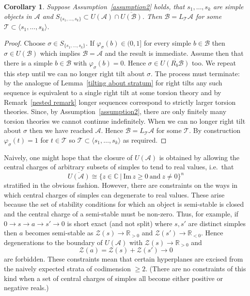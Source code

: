 \documentclass{article}
\theoremstyle{plain}
\newtheorem{corollary}[theorem]{Corollary}
\theoremstyle{definition}
\theoremstyle{remark}
\newcommand{\ie}{i.e.\ }
\newcommand{\R}{\mathbb{R}}
\newcommand{\C}{\mathbb{C}}
\newcommand{\cat}[1]{\mathcal{#1}}
\begin{document}
\begin{corollary}
\label{intersection corollary converse}
Suppose Assumption~\ref{assumption2} holds, that $s_1,\ldots,s_k$ are simple objects in $\cat{A}$ and $S_{\{s_1,\ldots,s_k\}} \subset U(\cat{A}) \cap  \overline{U(\cat{B})}$. Then $\cat{B}=L_\cat{T}\cat{A}$ for some $\cat{T}\subset \langle s_1,\ldots,s_k\rangle$.
\end{corollary}
\begin{proof}
Choose $\sigma \in S_{\{s_1,\ldots,s_k\}}$. If $\varphi_\sigma(b) \in (0,1]$ for every simple $b\in \cat{B}$ then $\sigma \in U(\cat{B})$ which implies $\cat{B}=\cat{A}$ and the result is immediate. Assume then that there is a simple $b\in \cat{B}$ with $\varphi_\sigma(b) = 0$. Hence $\sigma \in \overline{U(R_{b}\cat{B})}$ too. We repeat this step until we can no longer right tilt about $\sigma$. The process must terminate: by the analogue of Lemma~\ref{tilting about stratum} for right tilts  any such sequence is equivalent to a single right tilt at some torsion theory and by Remark~\ref{nested remark} longer sequences correspond to strictly larger  torsion theories. Since, by Assumption~\ref{assumption2}, there are only finitely many torsion theories we cannot continue indefinitely. When we can no longer right tilt about $\sigma$ then we have reached $\cat{A}$. Hence $\cat{B} = L_\cat{T}\cat{A}$ for some $\cat{T}$. By construction $\varphi_\sigma(t) =1$ for $t\in \cat{T}$ so $\cat{T} \subset \langle s_1, \ldots,s_k\rangle$ as required.
\end{proof}

Naively, one might hope that the closure of $U(\cat{A})$ is obtained by allowing the central charges of arbitrary subsets of simples to tend to real values, \ie that
$$
\overline{U(\cat{A})} \cong \{ z\in \C \ |\ \mathrm{Im}\, z \geq 0\ \textrm{and} \ z\neq 0\}^n
$$
stratified in the obvious fashion. However, there are constraints on the ways in which central charges of simples can degenerate to real values. These arise because the set of stability conditions for which an object is semi-stable is closed \cite[Proposition 8.1]{MR2373143} and the central charge of a semi-stable must be non-zero. Thus, for example, if $0 \to s \to a \to s'\to 0$ is short exact (and not split) where $s,s'$ are distinct simples then $a$ becomes semi-stable as $\mathcal{Z}(s) \to \R_{>0}$ and $\mathcal{Z}(s') \to \R_{<0}$. Hence degenerations to the boundary of $U(\cat{A})$ with $\mathcal{Z}(s) \to \R_{>0}$ and 
$$
\label{naive}
\mathcal{Z}(a) = \mathcal{Z}(s) + \mathcal{Z}(s') \to 0
$$
are forbidden. These constraints mean that certain hyperplanes are excised from the naively expected strata of codimension $\geq 2$. (There are no constraints of this kind when a set of central charges of simples all become either positive or negative reals.) 
\end{document}
